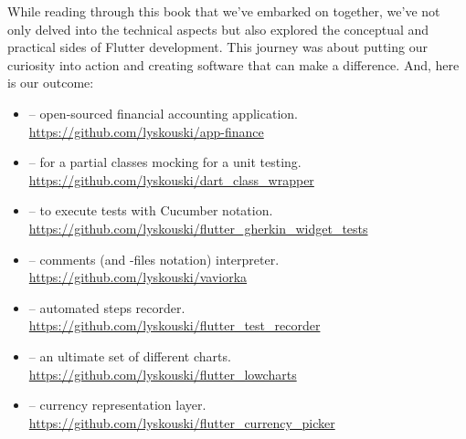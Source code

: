 
While reading through this book that we've embarked on together, we've not only delved into the technical aspects but 
also explored the conceptual and practical sides of Flutter development. This journey was about putting our curiosity 
into action and creating software that can make a difference. And, here is our outcome:

\begin{itemize}
\item {} -- open-sourced financial accounting application.\\
\href{https://github.com/lyskouski/app-finance}{https://github.com/lyskouski/app-finance}

\item {} -- for a partial classes mocking for a unit testing.\\
\href{https://github.com/lyskouski/dart\_class\_wrapper}{https://github.com/lyskouski/dart\_class\_wrapper}

\item {} -- to execute tests with Cucumber notation.\\
\href{https://github.com/lyskouski/flutter\_gherkin\_widget\_tests}{https://github.com/lyskouski/flutter\_gherkin\_widget\_tests}

\item {} --  comments (and -files notation) interpreter.\\
\href{https://github.com/lyskouski/vaviorka}{https://github.com/lyskouski/vaviorka}

\item {} -- automated steps recorder.\\
\href{https://github.com/lyskouski/flutter\_test\_recorder}{https://github.com/lyskouski/flutter\_test\_recorder}

\item {} -- an ultimate set of different charts.\\
\href{https://github.com/lyskouski/flutter\_lowcharts}{https://github.com/lyskouski/flutter\_lowcharts}

\item {} -- currency representation layer.\\
\href{https://github.com/lyskouski/flutter\_currency\_picker}{https://github.com/lyskouski/flutter\_currency\_picker}


\end{itemize}
